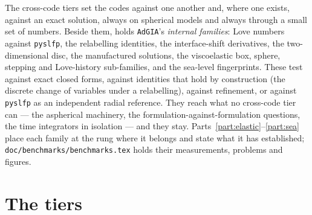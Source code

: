 \documentclass[11pt]{article}
\numberwithin{equation}{section}
\newcommand{\code}[1]{\texttt{#1}}
\begin{document}
The cross-code tiers set the codes against one another and, where one
exists, against an exact solution, always on spherical models and always
through a small set of numbers. Beside them,  holds
\code{AdGIA}'s \emph{internal families}: Love numbers against
\code{pyslfp}, the relabelling identities, the interface-shift derivatives,
the two-dimensional disc, the manufactured solutions, the viscoelastic box,
sphere, stepping and Love-history sub-families, and the sea-level
fingerprints. These test
against exact closed forms, against identities that hold by construction
(the discrete change of variables under a relabelling), against refinement,
or against \code{pyslfp} as an independent radial reference. They reach
what no cross-code tier can --- the aspherical machinery, the
formulation-against-formulation questions, the time integrators in
isolation --- and they stay. Parts~\ref{part:elastic}--\ref{part:sea} place
each family at the rung where it belongs and state what it has
established; \code{doc/benchmarks/benchmarks.tex} holds their
measurements, problems and figures.

\section{The tiers}
\label{sec:tiers}
\end{document}
